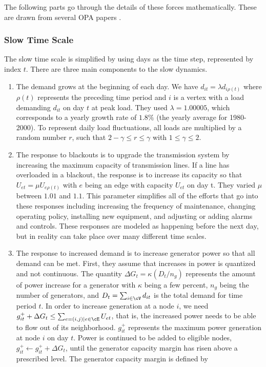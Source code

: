 The following parts go through the details of these forces mathematically.  These are drawn from several OPA papers \cite{dobson_2001,carreras_2004,dobson_2007}.  

\subsubsection{Slow Time Scale}
The slow time scale is simplified by using days as the time step, represented by index $t$.  There are three main components to the slow dynamics.
\begin{enumerate}
\item The demand grows at the beginning of each day.  We have $d_{it} = \lambda d_{i \rho(t)}$ where $\rho(t)$ represents the preceding time period and $i$ is a vertex with a load demanding $d_{it}$ on day $t$ at peak load.  They used $\lambda = 1.00005$, which corresponds to a yearly growth rate of $1.8\%$ (the yearly average for 1980-2000).  To represent daily load fluctuations, all loads are multiplied by a random number $r$, such that $2-\gamma \le r \le \gamma$ with $1 \le \gamma \le 2$.
\item The response to blackouts is to upgrade the transmission system by increasing the maximum capacity of transmission lines.  If a line has overloaded in a blackout, the response is to increase its capacity so that $U_{et} = \mu U_{e \rho(t)}$ with $e$ being an edge with capacity $U_{et}$ on day t.  They varied $\mu$ between $1.01$ and  $1.1$.  This parameter simplifies all of the efforts that go into these responses including increasing the frequency of maintenance, changing operating policy, installing new equipment, and adjusting or adding alarms and controls.  These responses are modeled as happening before the next day, but in reality can take place over many different time scales.
\item The response to increased demand is to increase generator power so that all demand can be met.  First, they assume that increases in power is quantized and not continuous.  The quantity $\Delta G_t = \kappa ( D_t / n_g )$ represents the amount of power increase for a generator with $\kappa$ being a few percent, $n_g$ being the number of generators, and $D_t = \sum_{i \in \cV} d_{it}$ is the total demand for time period $t$.  In order to increase generation at a node $i$, we need $g_{it}^+ + \Delta G_t \le \sum_{e=(i,j) | e \in \cE} U_{et}$, that is, the increased power needs to be able to flow out of its neighborhood.  $g_{it}^+$ represents the maximum power generation at node $i$ on day $t$.  Power is continued to be added to eligible nodes, $g_{it}^+ \leftarrow g_{it}^ + + \Delta G_t$, until the generator capacity margin has risen above a prescribed level.  The generator capacity margin is defined by

\end{enumerate}
